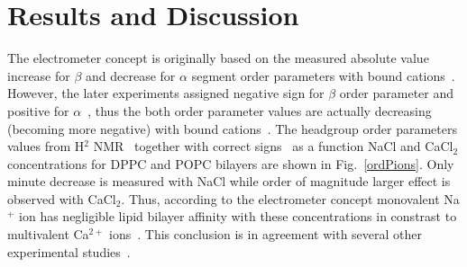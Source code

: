 \documentclass[pre,aps,floatfix,authordate1-4,twocolumn]{revtex4-1}
\begin{document}
\section{Results and Discussion}
The electrometer concept is originally based on the measured absolute value increase for $\beta$ 
and decrease for $\alpha$ segment order parameters with bound cations~\cite{akutsu81,altenbach84,seelig87,scherer89}.
However, the later experiments assigned negative sign for $\beta$ order parameter and positive for $\alpha$~\cite{hong95a,hong95b,gross97},
thus the both order parameter values are actually decreasing (becoming more negative) with bound
cations~\cite{ollila15}. The headgroup order parameters values from H$^2$ NMR~\cite{akutsu81,altenbach84}
together with correct signs~\cite{hong95a,hong95b,gross97} as a function NaCl and CaCl$_2$ concentrations
for DPPC and POPC bilayers are shown in Fig.~\ref{ordPions}. Only minute decrease is measured with 
NaCl while order of magnitude larger effect is observed with CaCl$_2$. Thus, according to the electrometer concept
monovalent Na$^+$ ion has negligible lipid bilayer affinity with these concentrations in constrast to multivalent 
Ca$^{2+}$ ions~\cite{akutsu81,altenbach84}. This conclusion is in agreement with several other experimental 
studies~\cite{cevc90,tocanne90,binder02,pabst07,filippov09}.
\end{document}
